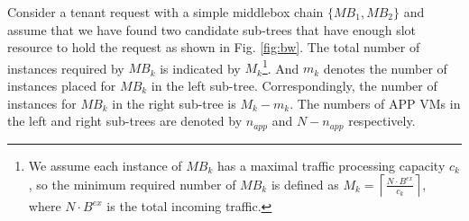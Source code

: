 \documentclass[review]{elsarticle}
\begin{document}
Consider a tenant request with a simple middlebox chain $\{MB_1, MB_2\}$ and assume that we have found two candidate sub-trees that have enough slot resource to hold the request 
as shown in Fig. \ref{fig:bw}. %
The total number of instances required by $MB_k$ is indicated by $M_k$\footnote{We assume each instance of $MB_k$ has a maximal traffic processing capacity $c_k$, so the minimum required number of $MB_k$ is defined as 
	$M_{k}={\left\lceil\frac{N \cdot B^{ex}}{c_{k}}\right\rceil}$,
	where $N\cdot B^{ex}$ is the total incoming traffic.}. And $m_k$ denotes the number of instances placed for $MB_k$  in the left sub-tree. %
 Correspondingly, the number of instances for $MB_k$ in the right sub-tree is $M_k-m_k$. The numbers of APP VMs in the left and right sub-trees are denoted by $n_{app}$ and $N-n_{app}$ respectively. %
\end{document}
